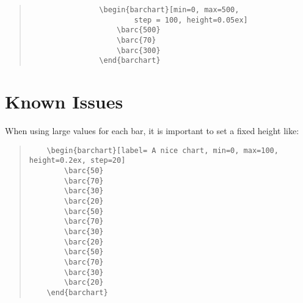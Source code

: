\documentclass[]{article}
\begin{document}
\begin{center}
	\begin{minipage}[l][][c]{0.45\linewidth} 
		\begin{quote}\small
			\begin{verbatim}
				\begin{barchart}[min=0, max=500, 
						step = 100, height=0.05ex]
				    \barc{500}
				    \barc{70}
				    \barc{300}
				\end{barchart}
			\end{verbatim}
		\end{quote}
	\end{minipage}
	\quad
	\begin{minipage}[r][][c]{0.45\linewidth}
		\begin{barchart}[min=0, max=500, step = 100, height=0.05ex]
		\end{barchart}
	\end{minipage}
\end{center}


\section{Known Issues}
When using large values for each bar, it is important to set a fixed height like: 
\begin{quote}\small
\begin{verbatim}
	\begin{barchart}[label= A nice chart, min=0, max=100, height=0.2ex, step=20]
	    \barc{50}
	    \barc{70}
	    \barc{30}
	    \barc{20}
	    \barc{50}
	    \barc{70}
	    \barc{30}
	    \barc{20}
	    \barc{50}
	    \barc{70}
	    \barc{30}
	    \barc{20}
	\end{barchart}
\end{verbatim}
\end{quote}

\begin{quote}\small
	\begin{barchart}[label= A nice chart, min=0, max=100, height=0.2ex, step=20]
	\end{barchart}
\end{quote}
\end{document}
